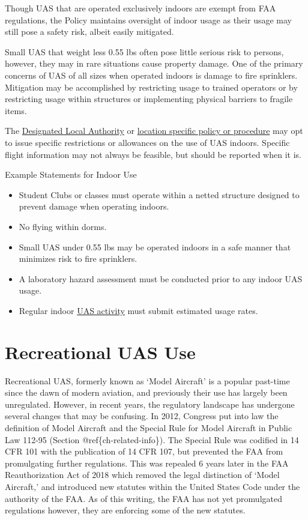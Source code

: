 \documentclass[
]{book}
\providecommand{\tightlist}{%
  \setlength{\itemsep}{0pt}\setlength{\parskip}{0pt}}
\begin{document}
Though UAS that are operated exclusively indoors are exempt from FAA regulations, the Policy maintains oversight of indoor usage as their usage may still pose a safety risk, albeit easily mitigated.

Small UAS that weight less 0.55 lbs often pose little serious risk to persons, however, they may in rare situations cause property damage. One of the primary concerns of UAS of all sizes when operated indoors is damage to fire sprinklers. Mitigation may be accomplished by restricting usage to trained operators or by restricting usage within structures or implementing physical barriers to fragile items.

The \protect\hyperlink{DLA}{Designated Local Authority} or \protect\hyperlink{LSP}{location specific policy or procedure} may opt to issue specific restrictions or allowances on the use of UAS indoors. Specific flight information may not always be feasible, but should be reported when it is.

Example Statements for Indoor Use

\begin{itemize}
\tightlist
\item
  Student Clubs or classes must operate within a netted structure designed to prevent damage when operating indoors.
\item
  No flying within dorms.
\item
  Small UAS under 0.55 lbs may be operated indoors in a safe manner that minimizes risk to fire sprinklers.
\item
  A laboratory hazard assessment must be conducted prior to any indoor UAS usage.
\item
  Regular indoor \protect\hyperlink{UASactivity}{UAS activity} must submit estimated usage rates.
\end{itemize}

\hypertarget{recreational-uas-use}{%
\section{Recreational UAS Use}\label{recreational-uas-use}}

Recreational UAS, formerly known as `Model Aircraft' is a popular past-time since the dawn of modern aviation, and previously their use has largely been unregulated. However, in recent years, the regulatory landscape has undergone several changes that may be confusing. In 2012, Congress put into law the definition of Model Aircraft and the Special Rule for Model Aircraft in Public Law 112-95 (Section @ref\{ch-related-info\}). The Special Rule was codified in 14 CFR 101 with the publication of 14 CFR 107, but prevented the FAA from promulgating further regulations. This was repealed 6 years later in the FAA Reauthorization Act of 2018 which removed the legal distinction of `Model Aircraft,' and introduced new statutes within the United States Code under the authority of the FAA. As of this writing, the FAA has not yet promulgated regulations however, they are enforcing some of the new statutes.
\end{document}
